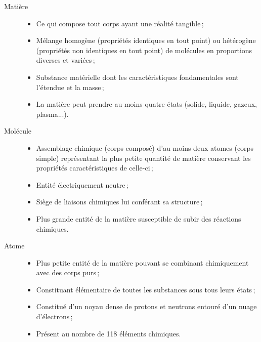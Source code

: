 \begin{description} %

	\item[Matière]\hfill %
		\begin{itemize} %
			\item Ce qui compose tout corps ayant une réalité tangible\,;
			\item Mélange homogène (propriétés identiques en tout point) ou hétérogène (propriétés non identiques en tout point) de molécules en proportions diverses et variées\,;
			\item Substance matérielle dont les caractéristiques fondamentales sont l'étendue et la masse\,;
			\item La matière peut prendre au moins quatre états (solide, liquide, gazeux, plasma...).
		\end{itemize}

	\item[Molécule]\hfill %
		\begin{itemize}
			\item Assemblage chimique (corps composé) d'au moins deux atomes (corps simple) représentant la plus petite quantité de matière conservant les propriétés caractéristiques de celle-ci\,;
			\item Entité électriquement neutre\,;
			\item Siège de liaisons chimiques lui conférant sa structure\,;
			\item Plus grande entité de la matière susceptible de subir des réactions chimiques. 
		\end{itemize}

	\item[Atome]\hfill %
		\begin{itemize}
			\item Plus petite entité de la matière pouvant se combinant chimiquement avec des corps purs\,;
			\item Constituant élémentaire de toutes les substances sous tous leurs états\,;
			\item Constitué d'un noyau dense de protons et neutrons entouré d'un nuage d'électrons\,;
			\item Présent au nombre de 118 éléments chimiques.
		\end{itemize}


\end{description}
